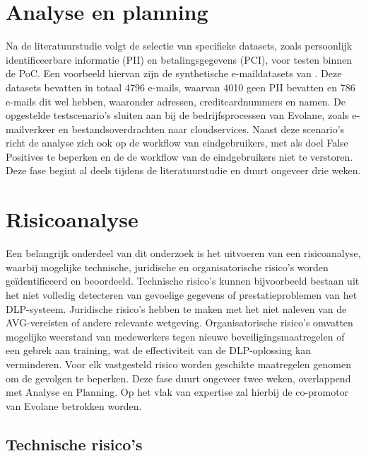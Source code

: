 \section{Analyse en planning}%

Na de literatuurstudie volgt de selectie van specifieke datasets, zoals persoonlijk identificeerbare informatie (PII) en betalingsgegevens (PCI), voor testen binnen de PoC.
Een voorbeeld hiervan zijn de synthetische e-maildatasets van \textcite{Whelan2014}. 
Deze datasets bevatten in totaal 4796 e-mails, waarvan 4010 geen PII bevatten en 786 e-mails dit wel hebben, 
waaronder adressen, creditcardnummers en namen. 
De opgestelde testscenario's sluiten aan bij de bedrijfsprocessen van Evolane, zoals e-mailverkeer en bestandsoverdrachten naar cloudservices. 
Naast deze scenario's richt de analyse zich ook op de workflow van eindgebruikers, met als doel False Positives te beperken en de de workflow van de eindgebruikers niet te verstoren.
Deze fase begint al deels tijdens de literatuurstudie en duurt ongeveer drie weken.

\section{Risicoanalyse}%

Een belangrijk onderdeel van dit onderzoek is het uitvoeren van een risicoanalyse, waarbij mogelijke technische, juridische en organisatorische risico's worden geïdentificeerd en beoordeeld. 
Technische risico's kunnen bijvoorbeeld bestaan uit het niet volledig detecteren van gevoelige gegevens of prestatieproblemen van het DLP-systeem. 
Juridische risico's hebben te maken met het niet naleven van de AVG-vereisten of andere relevante wetgeving. 
Organisatorische risico's omvatten mogelijke weerstand van medewerkers tegen nie\-uwe beveiligingsmaatregelen of een gebrek aan training, 
wat de effectiviteit van de DLP-oplossing kan verminderen. 
Voor elk vastgesteld risico worden geschikte maatregelen genomen om de gevolgen te beperken. 
Deze fase duurt ongeveer twee weken, overlappend met Analyse en Planning. Op het vlak van expertise zal hierbij de co-promotor van Evolane betrokken worden. 

\subsection{Technische risico's}

